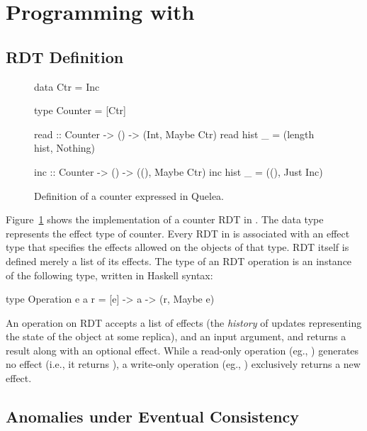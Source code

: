 \section{Programming with \name}
\label{sec:motivation}

\subsection{RDT Definition}

\begin{figure}
\begin{codehaskell}
data Ctr = Inc

type Counter = [Ctr]

read :: Counter -> () -> (Int, Maybe Ctr)
read hist _ = (length hist, Nothing)

inc :: Counter -> () -> ((), Maybe Ctr)
inc hist _ = ((), Just Inc)
\end{codehaskell}
\caption{Definition of a counter expressed in Quelea.}
\label{fig:ex}
\end{figure}

Figure~\ref{fig:ex} shows the implementation of a counter RDT in
\name. The data type  represents the effect type of counter.
Every RDT in \name is associated with an effect type that specifies
the effects allowed on the objects of that type. RDT itself is defined
merely a list of its effects. The type of an RDT operation is an
instance of the following type, written in Haskell syntax:

\begin{codehaskell}
type Operation e a r = [e] -> a -> (r, Maybe e)
\end{codehaskell}

\noindent An operation on RDT accepts a list of effects (the
\emph{history} of updates representing the state of the object at some
replica), and an input argument, and returns a result along with an
optional effect.  While a read-only operation (eg., )
generates no effect (i.e., it returns ), a write-only
operation (eg., ) exclusively returns a new effect.

\subsection{Anomalies under Eventual Consistency}

